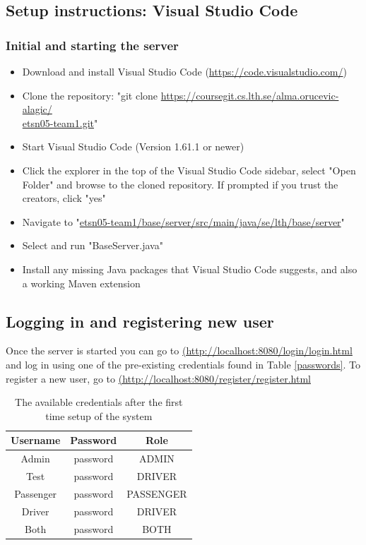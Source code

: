 \documentclass{article}
\begin{document}
\subsection{Setup instructions:  Visual Studio Code}

\subsubsection{Initial and starting the server}
\begin{itemize}
\item Download and install Visual Studio Code (\url{https://code.visualstudio.com/})
\item Clone the repository: "git clone \url{https://coursegit.cs.lth.se/alma.orucevic-alagic/} \\
\url{etsn05-team1.git}"
\item Start Visual Studio Code (Version 1.61.1 or newer)
\item Click the explorer in the top of the Visual Studio Code sidebar, select "Open Folder" and browse to the cloned repository. If prompted if you trust the creators, click "yes"
\item Navigate to "\url{etsn05-team1/base/server/src/main/java/se/lth/base/server}"
\item Select and run "BaseServer.java"
\item Install any missing Java packages that Visual Studio Code suggests, and also a working Maven extension
\end{itemize}


\subsection{Logging in and registering new user}
Once the server is started you can go to \url{(http://localhost:8080/login/login.html} and log in using one of the pre-existing credentials found in Table \ref{passwords}. To register a new user, go to \url{(http://localhost:8080/register/register.html}

\begin{table}[h!]\label{passwords}
    \centering
    \begin{tabular}{|c|c|c|}
        \hline
         Username & Password & Role \\\hline\hline
         Admin & password & ADMIN \\\hline
         Test & password & DRIVER \\\hline
         Passenger & password & PASSENGER \\\hline
        Driver & password & DRIVER \\\hline
        Both & password & BOTH\\\hline
    \end{tabular}
    \caption{The available credentials after the first time setup of the system}
    \label{tab:my_label}
\end{table}
\end{document}
